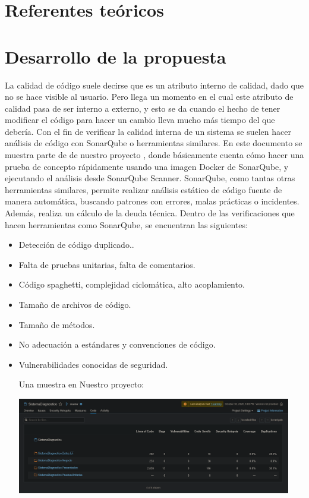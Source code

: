 \documentclass[preprint,12pt]{elsarticle}
\begin{document}
	\section{Referentes teóricos}

\section{Desarrollo de la propuesta}
La calidad de código suele decirse que es un atributo interno de calidad, dado que no se hace visible al usuario. Pero llega un momento en el cual este atributo de calidad pasa de ser interno a externo, y esto se da cuando el hecho de tener modificar el código para hacer un cambio lleva mucho más tiempo del que debería. Con el fin de verificar la calidad interna de un sistema se suelen hacer análisis de código con SonarQube o herramientas similares. En este documento se muestra parte de de nuestro proyecto , donde básicamente  cuenta cómo hacer una prueba de concepto rápidamente usando una imagen Docker de SonarQube, y ejecutando el análisis desde SonarQube Scanner.
SonarQube, como tantas otras herramientas similares, permite realizar análisis estático de código fuente de manera automática, buscando patrones con errores, malas prácticas o incidentes. Además, realiza un cálculo de la deuda técnica. Dentro de las verificaciones que hacen herramientas como SonarQube, se encuentran las siguientes:
\begin{itemize}
	\item Detección de código duplicado..
	\item Falta de pruebas unitarias, falta de comentarios. 
	\item Código spaghetti, complejidad ciclomática, alto acoplamiento.
	\item Tamaño de archivos de código.
	\item Tamaño de métodos.
	\item No adecuación a estándares y convenciones de código.
	\item Vulnerabilidades conocidas de seguridad.
	
	Una muestra en Nuestro proyecto:
		
\begin{center}
	\includegraphics[width=12cm]{./imagen/Screenshot_2020-10-30 Code.png} 
	\end{center}
\end{itemize}
\end{document}
